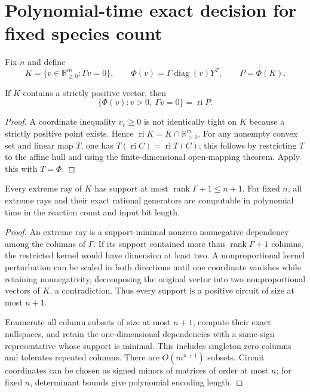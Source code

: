 \section{Polynomial-time exact decision for fixed species count}
\label{sec:fixed-n-independent}

Fix $n$ and define
\[
 K=\{v\in\mathbb R_{\geq0}^m:\Gamma v=0\},\qquad
 \Phi(v)=\Gamma\operatorname{diag}(v)Y^T,\qquad P=\Phi(K).
\]

\begin{lemma}
\label{lem:ri-projection-independent}
If $K$ contains a strictly positive vector, then
\[
 \{\Phi(v):v>0,\ \Gamma v=0\}=\operatorname{ri}P.
\]
\end{lemma}

\begin{proof}
A coordinate inequality $v_r\geq0$ is not identically tight on $K$ because a
strictly positive point exists. Hence
$\operatorname{ri}K=K\cap\mathbb R_{>0}^m$. For any nonempty convex set and
linear map $T$, one has $T(\operatorname{ri}C)=\operatorname{ri}T(C)$; this
follows by restricting $T$ to the affine hull and using the finite-dimensional
open-mapping theorem. Apply this with $T=\Phi$.
\end{proof}

\begin{lemma}
\label{lem:circuits-independent}
Every extreme ray of $K$ has support at most
$\operatorname{rank}\Gamma+1\leq n+1$. For fixed $n$, all extreme rays and
their exact rational generators are computable in polynomial time in the
reaction count and input bit length.
\end{lemma}

\begin{proof}
An extreme ray is a support-minimal nonzero nonnegative dependency among the
columns of $\Gamma$. If its support contained more than
$\operatorname{rank}\Gamma+1$ columns, the restricted kernel would have
dimension at least two. A nonproportional kernel perturbation can be scaled in
both directions until one coordinate vanishes while retaining
nonnegativity, decomposing the original vector into two nonproportional
vectors of $K$, a contradiction. Thus every support is a positive circuit of
size at most $n+1$.

Enumerate all column subsets of size at most $n+1$, compute their exact
nullspaces, and retain the one-dimensional dependencies with a same-sign
representative whose support is minimal. This includes singleton zero columns
and tolerates repeated columns. There are $O(m^{n+1})$ subsets. Circuit
coordinates can be chosen as signed minors of matrices of order at most $n$;
for fixed $n$, determinant bounds give polynomial encoding length.
\end{proof}

